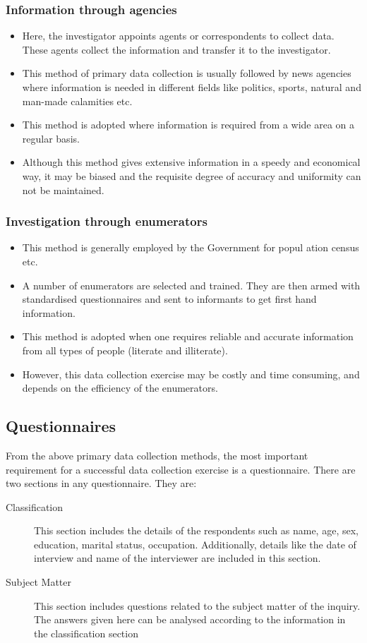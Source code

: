 \documentclass[
10pt, %
a4paper, %
]{report}
\begin{document}
\subsubsection*{Information through agencies}
\begin{itemize}
\item  Here, the investigator appoints agents or correspondents to collect data. These agents collect the information and transfer it to the investigator.
\item This method of primary data collection is usually followed by
news agencies where information is needed in different fields like
politics, sports, natural and man-made calamities etc.
\item This method is adopted where information is required from a
wide area on a regular basis.
\item Although this method gives extensive information in a speedy and economical way, it may be biased and the requisite degree of accuracy and uniformity can not be maintained.
\end{itemize}
\subsubsection*{Investigation through enumerators}
\begin{itemize}
\item This method is generally employed by the Government for popul
ation census etc.
\item A number of enumerators are selected and trained. They are then armed with standardised questionnaires and sent to informants to get first hand information.
\item This method is adopted when one requires reliable and accurate
information from all types of people (literate and illiterate).
\item However, this data collection exercise may be costly and time
consuming, and depends on the efficiency of the enumerators.
\end{itemize}

\subsection*{Questionnaires}
From the above primary data collection methods, the most important
requirement for a successful data collection exercise is a questionnaire. There are two sections in any questionnaire. They are:
\begin{description}
\item[Classification] This section includes the details of the respondents such as name, age, sex, education, marital status, occupation. Additionally, details like the date of interview and name of the interviewer are included in this section.
\item[Subject Matter] This section includes questions related to the subject matter of the inquiry. The answers given here can be analysed according to the information in the classification section
\end{description}
\end{document}
